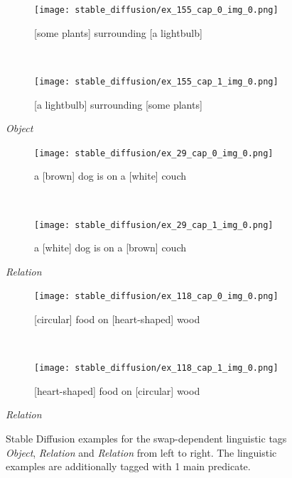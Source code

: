 \begin{figure}[ht]
\centering
    \begin{minipage}[t]{.30\textwidth}
        \begin{subfigure}[t]{\textwidth}
        \centering
        \texttt{[image: stable\_diffusion/ex\_155\_cap\_0\_img\_0.png]}
        \caption{[some plants] surrounding [a lightbulb]}
        \end{subfigure}\\
        \begin{subfigure}[t]{\textwidth}
        \centering
        \texttt{[image: stable\_diffusion/ex\_155\_cap\_1\_img\_0.png]}
        \caption{[a lightbulb] surrounding [some plants]}
        \end{subfigure}%
        \caption*{\textit{Object}}
    \end{minipage}
    \hfill
    \begin{minipage}[t]{.30\textwidth}
        \begin{subfigure}[t]{\textwidth}
        \centering
        \texttt{[image: stable\_diffusion/ex\_29\_cap\_0\_img\_0.png]}
        \caption{a [brown] dog is on a [white] couch}
        \end{subfigure}\\
        \vspace{10pt}
        \begin{subfigure}[t]{\textwidth}
        \centering
        \texttt{[image: stable\_diffusion/ex\_29\_cap\_1\_img\_0.png]}
        \caption{a [white] dog is on a [brown] couch}
        \end{subfigure}%
        \vspace{10pt}
        \caption*{\textit{Relation}}
    \end{minipage}
    \hfill
    \begin{minipage}[t]{.30\textwidth}
        \begin{subfigure}[t]{\textwidth}
        \centering
        \texttt{[image: stable\_diffusion/ex\_118\_cap\_0\_img\_0.png]}
        \caption{[circular] food on [heart-shaped] wood}
        \end{subfigure}\\
        \begin{subfigure}[t]{\textwidth}
        \centering
        \texttt{[image: stable\_diffusion/ex\_118\_cap\_1\_img\_0.png]}
        \caption{[heart-shaped] food on [circular] wood}
        \end{subfigure}%
        \caption*{\textit{Relation}}
    \end{minipage}%
    \caption{Stable Diffusion examples for the swap-dependent linguistic tags \textit{Object}, \textit{Relation} and \textit{Relation} from left to right. The linguistic examples are additionally tagged with 1 main predicate.}
    \label{fig:stable-diffusion-examples}
\end{figure}

